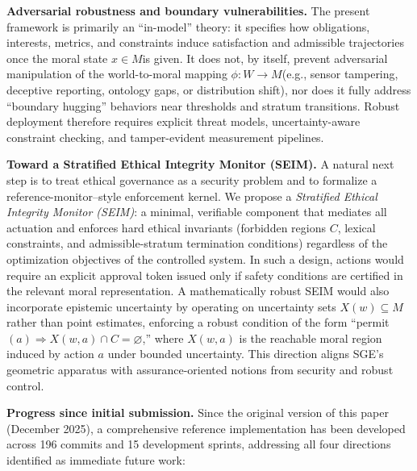 \documentclass[12pt]{article}
\theoremstyle{plain}
\theoremstyle{definition}
\theoremstyle{remark}
\begin{document}
\textbf{Adversarial robustness and boundary vulnerabilities.} The
present framework is primarily an ``in-model'' theory: it specifies how
obligations, interests, metrics, and constraints induce satisfaction and
admissible trajectories once the moral state \(x \in M\)is given. It
does not, by itself, prevent adversarial manipulation of the
world-to-moral mapping \(\phi:W \rightarrow M\)(e.g., sensor tampering,
deceptive reporting, ontology gaps, or distribution shift), nor does it
fully address ``boundary hugging'' behaviors near thresholds and stratum
transitions. Robust deployment therefore requires explicit threat
models, uncertainty-aware constraint checking, and tamper-evident
measurement pipelines.

\textbf{Toward a Stratified Ethical Integrity Monitor (SEIM).} A natural
next step is to treat ethical governance as a security problem and to
formalize a reference-monitor--style enforcement kernel. We propose a
\emph{Stratified Ethical Integrity Monitor (SEIM)}: a minimal,
verifiable component that mediates all actuation and enforces hard
ethical invariants (forbidden regions \(C\), lexical constraints, and
admissible-stratum termination conditions) regardless of the
optimization objectives of the controlled system. In such a design,
actions would require an explicit approval token issued only if safety
conditions are certified in the relevant moral representation. A
mathematically robust SEIM would also incorporate epistemic uncertainty
by operating on uncertainty sets \(X(w) \subseteq M\) rather than point
estimates, enforcing a robust condition of the form
``permit\((a) \Rightarrow X(w,a) \cap C = \varnothing\),'' where
\(X(w,a)\) is the reachable moral region induced by action \(a\) under
bounded uncertainty. This direction aligns SGE's geometric apparatus
with assurance-oriented notions from security and robust control.

\textbf{Progress since initial submission.} Since the original version of this paper (December 2025), a comprehensive reference implementation has been developed across 196 commits and 15 development sprints, addressing all four directions identified as immediate future work:
\end{document}
